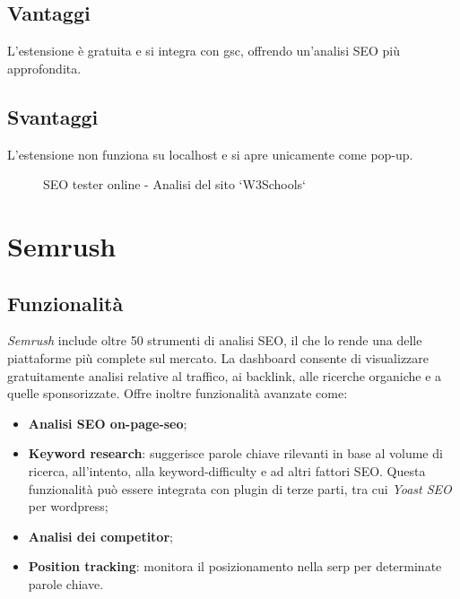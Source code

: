 \subsection{Vantaggi}
\par L'estensione è gratuita e si integra con \gls{gsc}, offrendo un'analisi SEO più approfondita.

\subsection{Svantaggi}
\par L'estensione non funziona su \gls{localhost} e si apre unicamente come pop-up.

\begin{figure}[H]
    \centering 
    \caption{SEO tester online - Analisi del sito `W3Schools`}
\end{figure}

\section{Semrush}

\subsection{Funzionalità}
\par \textit{Semrush} include oltre 50 strumenti di analisi SEO, il che lo rende una delle piattaforme più complete sul mercato. La dashboard consente di visualizzare gratuitamente analisi relative al traffico, ai \gls{backlink}, alle ricerche \gls{organiche} e a quelle \gls{sponsorizzate}. Offre inoltre funzionalità avanzate come:
\begin{itemize}
    \item \textbf{Analisi SEO \gls{on-page-seo}};
    \item \textbf{Keyword research}: suggerisce parole chiave rilevanti in base al volume di ricerca, all'intento, alla \gls{keyword-difficulty} e ad altri fattori SEO. Questa funzionalità può essere integrata con plugin di terze parti, tra cui \textit{Yoast SEO} per \gls{wordpress};
    \item \textbf{Analisi dei competitor};
    \item \textbf{Position tracking}: monitora il posizionamento nella \gls{serp} per determinate parole chiave.
\end{itemize}

